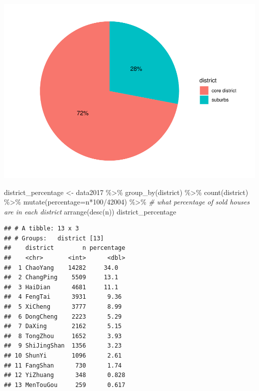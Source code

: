 \documentclass[
]{article}
\newenvironment{Shaded}{\begin{snugshade}}{\end{snugshade}}
\newcommand{\AttributeTok}[1]{\textcolor[rgb]{0.77,0.63,0.00}{#1}}
\newcommand{\CommentTok}[1]{\textcolor[rgb]{0.56,0.35,0.01}{\textit{#1}}}
\newcommand{\DecValTok}[1]{\textcolor[rgb]{0.00,0.00,0.81}{#1}}
\newcommand{\FunctionTok}[1]{\textcolor[rgb]{0.00,0.00,0.00}{#1}}
\newcommand{\NormalTok}[1]{#1}
\newcommand{\OtherTok}[1]{\textcolor[rgb]{0.56,0.35,0.01}{#1}}
\newcommand{\SpecialCharTok}[1]{\textcolor[rgb]{0.00,0.00,0.00}{#1}}
\begin{document}
\includegraphics{Project_files/figure-latex/unnamed-chunk-22-1.pdf}

\begin{Shaded}
\begin{Highlighting}[]
\NormalTok{district\_percentage }\OtherTok{\textless{}{-}}\NormalTok{ data2017 }\SpecialCharTok{\%\textgreater{}\%}
  \FunctionTok{group\_by}\NormalTok{(district) }\SpecialCharTok{\%\textgreater{}\%}
  \FunctionTok{count}\NormalTok{(district) }\SpecialCharTok{\%\textgreater{}\%}
  \FunctionTok{mutate}\NormalTok{(}\AttributeTok{percentage=}\NormalTok{n}\SpecialCharTok{*}\DecValTok{100}\SpecialCharTok{/}\DecValTok{42004}\NormalTok{) }\SpecialCharTok{\%\textgreater{}\%} \CommentTok{\# what percentage of sold houses are in each district}
  \FunctionTok{arrange}\NormalTok{(}\FunctionTok{desc}\NormalTok{(n))}
\NormalTok{district\_percentage}
\end{Highlighting}
\end{Shaded}

\begin{verbatim}
## # A tibble: 13 x 3
## # Groups:   district [13]
##    district        n percentage
##    <chr>       <int>      <dbl>
##  1 ChaoYang    14282     34.0  
##  2 ChangPing    5509     13.1  
##  3 HaiDian      4681     11.1  
##  4 FengTai      3931      9.36 
##  5 XiCheng      3777      8.99 
##  6 DongCheng    2223      5.29 
##  7 DaXing       2162      5.15 
##  8 TongZhou     1652      3.93 
##  9 ShiJingShan  1356      3.23 
## 10 ShunYi       1096      2.61 
## 11 FangShan      730      1.74 
## 12 YiZhuang      348      0.828
## 13 MenTouGou     259      0.617
\end{verbatim}
\end{document}
